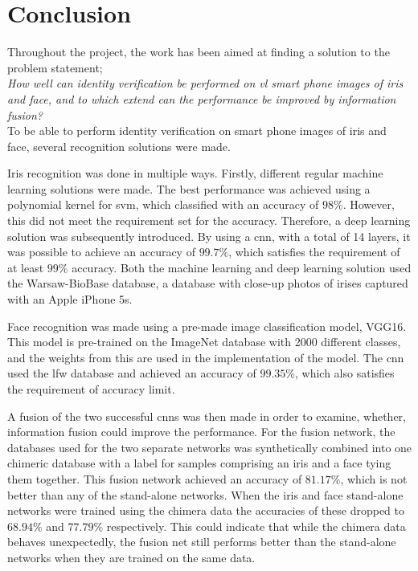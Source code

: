 \chapter{Conclusion}\label{ch:conclusion}\glsresetall
Throughout the project, the work has been aimed at finding a solution to the problem statement; \\

\textit{How well can identity verification be performed on \gls{vl} smart phone images of iris and face, and to which extend can the performance be improved by information fusion?}\\

To be able to perform identity verification on smart phone images of iris and face, several recognition solutions were made.

Iris recognition was done in multiple ways. Firstly, different regular machine learning solutions were made. The best performance was achieved using a polynomial kernel for \gls{svm}, which classified with an accuracy of $98\%$. However, this did not meet the requirement set for the accuracy. Therefore, a deep learning solution was subsequently introduced. By using a \gls{cnn}, with a total of 14 layers, it was possible to achieve an accuracy of $99.7\%$, which satisfies the requirement of at least $99\%$ accuracy. 
Both the machine learning and deep learning solution used the Warsaw-BioBase database, a database with close-up photos of irises captured with an Apple iPhone 5s.

Face recognition was made using a pre-made image classification model, VGG16. This model is pre-trained on the ImageNet database with 2000 different classes, and the weights from this are used in the implementation of the model. The \gls{cnn} used the \gls{lfw} database and achieved an accuracy of $99.35\%$, which also satisfies the requirement of accuracy limit.

A fusion of the two successful \gls{cnn}s was then made in order to examine, whether, information fusion could improve the performance. For the fusion network, the databases used for the two separate networks was synthetically combined into one chimeric database with a label for samples comprising an iris and a face tying them together. This fusion network achieved an accuracy of $81.17\%$, which is not better than any of the stand-alone networks. When the iris and face stand-alone networks were trained using the chimera data the accuracies of these dropped to $68.94\%$ and $77.79\%$ respectively. This could indicate that while the chimera data behaves unexpectedly, the fusion net still performs better than the stand-alone networks when they are trained on the same data.